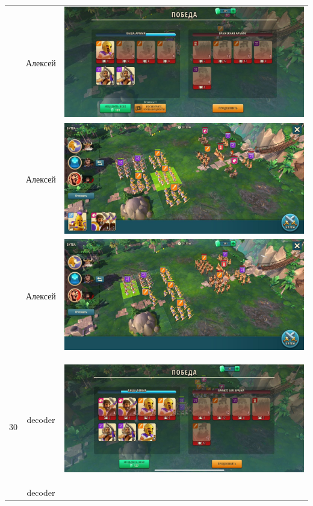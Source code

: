 \begin{longtable}{|c|c|c|}
	& Алексей &
	\includegraphics[width=0.75\linewidth]{./parts/media/TreasureHunt/30/alexey/photo_2022-04-14_12-35-50.jpg} \\
	& Алексей &
	\includegraphics[width=0.75\linewidth]{./parts/media/TreasureHunt/30/alexey/photo_2022-04-14_12-36-06.jpg} \\
	& Алексей &
	\includegraphics[width=0.75\linewidth]{./parts/media/TreasureHunt/30/alexey/photo_2022-04-14_12-35-59.jpg} \\
	\hline
	\multirow{11}{*}{30} & decoder &
	\hypertarget{fight30}{\includegraphics[width=0.75\linewidth]{./parts/media/TreasureHunt/30/decoder/photo_2022-04-07_10-00-32.jpg}} \\
	& decoder &

\end{longtable}
